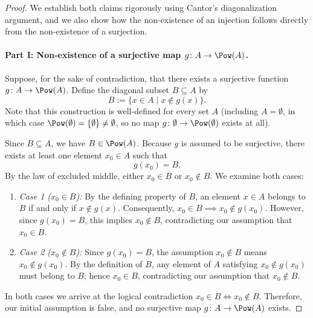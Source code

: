 
\begin{proof}
We establish both claims rigorously using Cantor's diagonalization argument, and we also show
how the non-existence of an injection follows directly from the non-existence of a surjection.

\paragraph{Part I: Non-existence of a surjective map $g\colon A\to\Pow(A)$.}
Suppose, for the sake of contradiction, that there exists a surjective function
$g\colon A\to\Pow(A)$. Define the diagonal subset $B\subseteq A$ by
\[ B:=\{x\in A\mid x\notin g(x)\}. \]
Note that this construction is well-defined for every set $A$ (including $A=\emptyset$, in
which case $\Pow(\emptyset)=\{\emptyset\}\neq\emptyset$, so no map
$g\colon\emptyset\to\Pow(\emptyset)$ exists at all).

Since $B\subseteq A$, we have $B\in\Pow(A)$. Because $g$ is assumed to be surjective, there
exists at least one element $x_0\in A$ such that
\[ g(x_0)=B. \]
By the law of excluded middle, either $x_0\in B$ or $x_0\notin B$. We examine both cases:
\begin{enumerate}[label=(\alph*)]
  \item \emph{Case 1 ($x_0\in B$):} By the defining property of $B$, an element $x\in A$
        belongs to $B$ if and only if $x\notin g(x)$. Consequently,
        $x_0\in B\implies x_0\notin g(x_0)$. However, since $g(x_0)=B$, this implies
        $x_0\notin B$, contradicting our assumption that $x_0\in B$.
  \item \emph{Case 2 ($x_0\notin B$):} Since $g(x_0)=B$, the assumption $x_0\notin B$ means
        $x_0\notin g(x_0)$. By the definition of $B$, any element of $A$ satisfying
        $x_0\notin g(x_0)$ must belong to $B$; hence $x_0\in B$, contradicting our assumption
        that $x_0\notin B$.
\end{enumerate}
In both cases we arrive at the logical contradiction $x_0\in B\iff x_0\notin B$. Therefore,
our initial assumption is false, and no surjective map $g\colon A\to\Pow(A)$ exists.


\end{proof}
